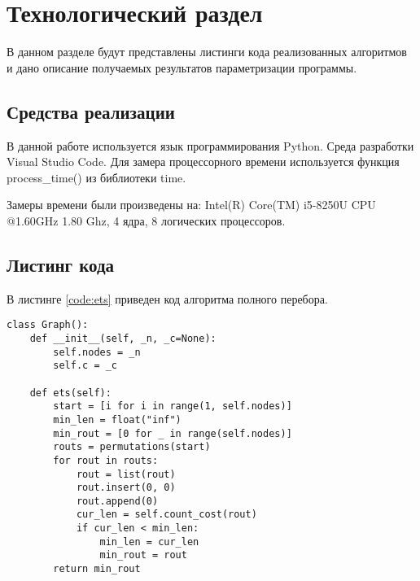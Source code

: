 \chapter{Технологический раздел}
\label{cha:impl}
В данном разделе будут представлены листинги кода реализованных алгоритмов и дано описание получаемых результатов параметризации программы.

\section{Средства реализации}
В данной работе используется язык программирования Python. Среда разработки Visual Studio Code. Для замера процессорного времени используется функция process\_time() из библиотеки time.
\par Замеры времени были произведены на: Intel(R) Core(TM) i5-8250U CPU @1.60GHz 1.80 Ghz, 4 ядра, 8 логических процессоров.

\section{Листинг кода}
В листинге \ref{code:ets} приведен код алгоритма полного перебора.
\begin{lstlisting}[caption= Алгоритм полного перебора, label=code:ets]
class Graph():
	def __init__(self, _n, _c=None):
		self.nodes = _n
		self.c = _c
	
	def ets(self):
		start = [i for i in range(1, self.nodes)]
		min_len = float("inf")
		min_rout = [0 for _ in range(self.nodes)]
		routs = permutations(start)
		for rout in routs:
			rout = list(rout)
			rout.insert(0, 0)
			rout.append(0)
			cur_len = self.count_cost(rout)
			if cur_len < min_len:
				min_len = cur_len
				min_rout = rout
		return min_rout
\end{lstlisting}

